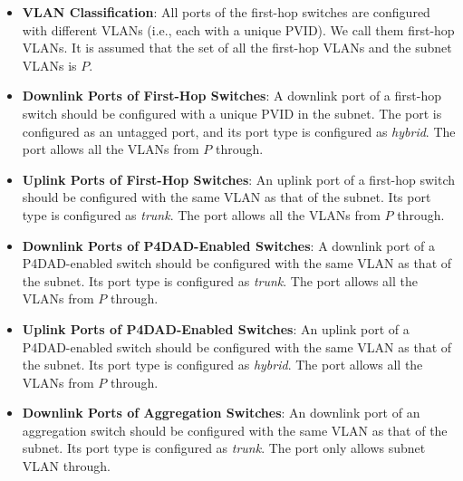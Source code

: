 \documentclass[a4paper,fleqn]{cas-dc}
\begin{document}
            \begin{itemize}
                \item \textbf{VLAN Classification}: All ports of the first-hop switches are configured with different VLANs (i.e., each with a unique PVID). We call them first-hop VLANs. It is assumed that the set of all the first-hop VLANs and the subnet VLANs is $P$.

                \item \textbf{Downlink Ports of First-Hop Switches}: A downlink port of a first-hop switch should be configured with a unique PVID in the subnet. The port is configured as an untagged port, and its port type is configured as \emph{hybrid}. The port allows all the VLANs from $P$ through.

                \item \textbf{Uplink Ports of First-Hop Switches}: An uplink port of a first-hop switch should be configured with the same VLAN as that of the subnet. Its port type is configured as \emph{trunk}. The port allows all the VLANs from $P$ through.

                \item \textbf{Downlink Ports of P4DAD-Enabled Switches}: A downlink port of a P4DAD-enabled switch should be configured with the same VLAN as that of the subnet. Its port type is configured as \emph{trunk}. The port allows all the VLANs from $P$ through.

                \item \textbf{Uplink Ports of P4DAD-Enabled Switches}: An uplink port of a P4DAD-enabled switch should be configured with the same VLAN as that of the subnet. Its port type is configured as \emph{hybrid}. The port allows all the VLANs from $P$ through.

                \item \textbf{Downlink Ports of Aggregation Switches}: An downlink port of an aggregation switch should be configured with the same VLAN as that of the subnet. Its port type is configured as \emph{trunk}. The port only allows subnet VLAN through.
            \end{itemize}
            
\end{document}
